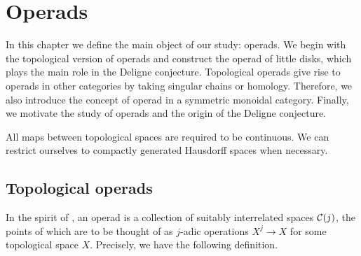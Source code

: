 \documentclass[TFM.tex]{subfiles}
\begin{document}
%
%

\chapter{Operads}\label{3}

In this chapter we define the main object of our study: operads. We begin with the topological version of operads and construct the operad of little disks, which plays the main role in the Deligne conjecture. Topological operads give rise to operads in other categories by taking singular chains or homology. Therefore, we also introduce the concept of operad in a symmetric monoidal category. Finally, we motivate the study of operads and the origin of the Deligne conjecture. 

All maps between topological spaces are required to be continuous. We can restrict ourselves to compactly generated Hausdorff spaces when necessary. 



\section{Topological operads}
%
In the spirit of \cite{May}, an operad is a collection of suitably interrelated spaces $\mathcal{C}(j)$, the points of which are to
be thought of as $j$-adic operations $X^j \to X$ for some topological space $X$. Precisely, we have the following definition.
\end{document}
